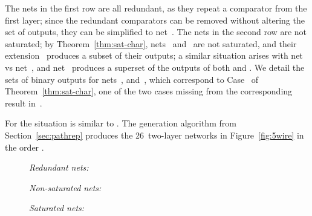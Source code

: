 \documentclass[10pt]{IEEEtran}
\begin{document}
{{The nets in the first row are all redundant, as they repeat a
comparator from the first layer; since the redundant comparators can
be removed without altering the set of outputs, they can be simplified to
net~.
The nets in the second row are not saturated; by
Theorem~\ref{thm:sat-char}, nets~ and~ are not saturated, and
their extension~ produces a subset of their outputs;
a similar situation arises with net~ vs net~, and net~
produces a superset of the outputs of both  and .  We detail the sets of
binary outputs for nets~,  and~, which correspond to
Case~ of Theorem~\ref{thm:sat-char}, one of the two cases missing
from the corresponding result in~\cite{DBLP:conf/lata/BundalaZ14}.




For  the situation is similar to .  The generation algorithm from Section~\ref{sec:pathrep} produces the
26~two-layer networks in Figure~\ref{fig:5wire} in the order
.

\begin{figure}

\smallskip\emph{Redundant nets:}\smallskip


\smallskip
{}

\smallskip\emph{Non-saturated nets:}\smallskip


\smallskip
{}

\smallskip\emph{Saturated nets:}\smallskip



\end{figure}}}
\end{document}
